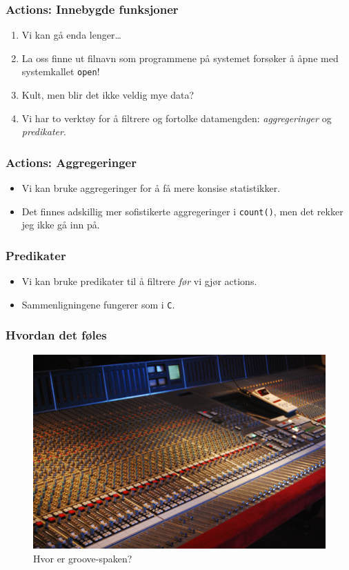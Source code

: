 \documentclass{beamer}
\begin{document}
 \begin{frame}
     \frametitle{Actions: Innebygde funksjoner}

\begin{enumerate}
    \item Vi kan gå enda lenger…

    \item La oss finne ut filnavn som programmene på systemet forsøker å åpne
        med systemkallet \texttt{open}!

\item Kult, men blir det ikke veldig mye data?

\item Vi har to verktøy for å filtrere og fortolke datamengden:
    \emph{aggregeringer} og \emph{predikater}.

\end{enumerate}
 \end{frame}

 \begin{frame}
     \frametitle{Actions: Aggregeringer}
     \begin{itemize}
 \item Vi kan bruke aggregeringer for å få mere konsise statistikker.

 \item Det finnes adskillig mer sofistikerte aggregeringer i \texttt{count()},
     men det rekker jeg ikke gå inn på.
     \end{itemize}
 \end{frame}

\begin{frame}
     \frametitle{Predikater}
     \begin{itemize}
         \item Vi kan bruke predikater til å filtrere \emph{før} vi gjør
             actions.
         \item Sammenligningene fungerer som i \texttt{C}.
     \end{itemize}
\end{frame}
\begin{frame}
\frametitle{Hvordan det føles}
\begin{figure}
\includegraphics[scale=0.08]{miksebord.jpg}
\caption{Hvor er groove-spaken?}
\end{figure}
\end{frame}
\end{document}
